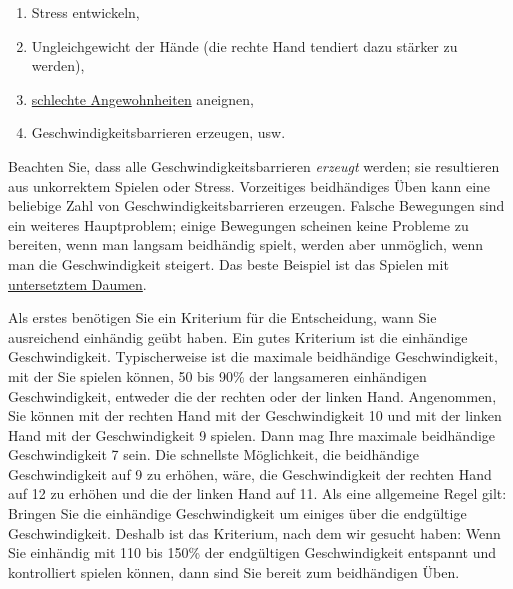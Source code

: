 \begin{enumerate}[label={\arabic*.}] 
 \item Stress entwickeln,
 \item Ungleichgewicht der Hände (die rechte Hand tendiert dazu stärker zu werden),
 \item \hyperref[c1ii22]{schlechte Angewohnheiten} aneignen,
 \item Geschwindigkeitsbarrieren erzeugen, usw.
\end{enumerate}

Beachten Sie, dass alle Geschwindigkeitsbarrieren \textit{erzeugt} werden; sie resultieren aus unkorrektem Spielen oder Stress.
Vorzeitiges beidhändiges Üben kann eine beliebige Zahl von Geschwindigkeitsbarrieren erzeugen.
Falsche Bewegungen sind ein weiteres Hauptproblem; einige Bewegungen scheinen keine Probleme zu bereiten, wenn man langsam beidhändig spielt, werden aber unmöglich, wenn man die Geschwindigkeit steigert.
Das beste Beispiel ist das Spielen mit \hyperref[c1iii5a]{untersetztem Daumen}.

Als erstes benötigen Sie ein Kriterium für die Entscheidung, wann Sie ausreichend einhändig geübt haben.
Ein gutes Kriterium ist die einhändige Geschwindigkeit.
Typischerweise ist die maximale beidhändige Geschwindigkeit, mit der Sie spielen können, 50 bis 90\% der langsameren einhändigen Geschwindigkeit, entweder die der rechten oder der linken Hand.
Angenommen, Sie können mit der rechten Hand mit der Geschwindigkeit 10 und mit der linken Hand mit der Geschwindigkeit 9 spielen.
Dann mag Ihre maximale beidhändige Geschwindigkeit 7 sein.
Die schnellste Möglichkeit, die beidhändige Geschwindigkeit auf 9 zu erhöhen, wäre, die Geschwindigkeit der rechten Hand auf 12 zu erhöhen und die der linken Hand auf 11.
Als eine allgemeine Regel gilt: Bringen Sie die einhändige Geschwindigkeit um einiges über die endgültige Geschwindigkeit.
Deshalb ist das Kriterium, nach dem wir gesucht haben: Wenn Sie einhändig mit 110 bis 150\% der endgültigen Geschwindigkeit entspannt und kontrolliert spielen können, dann sind Sie bereit zum beidhändigen Üben.


\label{notenweise}

